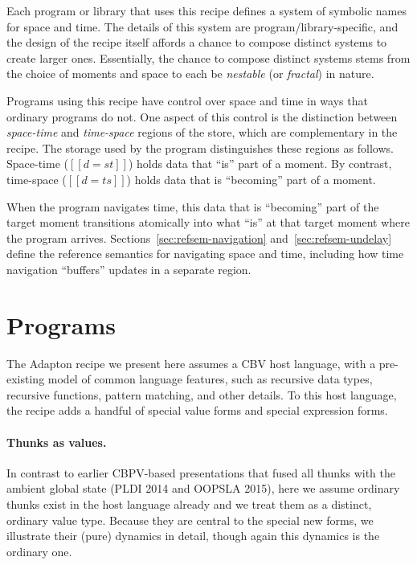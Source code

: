 \documentclass[11pt]{article}
\begin{document}
Each program or library that uses this recipe
defines a system of symbolic names for space and time.
The details of this system are program/library-specific, and the
design of the recipe itself affords a chance to compose distinct systems to
create larger ones.
Essentially, the chance to compose distinct systems stems from the choice of moments
and space to each be \emph{nestable} (or \emph{fractal}) in nature.

\nolinenumbers
\ottgrammartabular{
  {\makeLineNumber\stepLineNumber} \ottSpace
  \\
   {\makeLineNumber\stepLineNumber} \ottMoment
  \\
   {\makeLineNumber\stepLineNumber} \ottp
  \\
   {\makeLineNumber\stepLineNumber} \ottpp
  \\
  {\makeLineNumber\stepLineNumber} \ottd
}
\linenumbers

Programs using this recipe have control over space and time in ways
that ordinary programs do not.
%
One aspect of this control is the distinction between
\emph{space-time} and \emph{time-space} regions of the store, which are complementary in
the recipe.
%
The storage used by the program distinguishes these regions as follows.
%
Space-time ($[[d = st]]$) holds data that ``is'' part of a moment.
By contrast,
time-space ($[[d = ts]]$) holds data that is ``becoming'' part of a moment.

When the program navigates time, this data that is ``becoming'' part
of the target moment transitions atomically into what ``is'' at that
target moment where the program arrives.
%
Sections~\ref{sec:refsem-navigation} and~\ref{sec:refsem-undelay}
define the reference semantics for navigating space and time, including
how time navigation ``buffers'' updates in a separate region.


\section{Programs}
\label{sec:programs}

The Adapton recipe we present here assumes a CBV host language, with a
pre-existing model of common language features, such as recursive data
types, recursive functions, pattern matching, and other details.
%
To this host language, the recipe adds a handful of special value
forms and special expression forms.

\paragraph{Thunks as values.}
In contrast to earlier CBPV-based presentations that fused all thunks
with the ambient global state (PLDI 2014 and OOPSLA 2015), here we
assume ordinary thunks exist in the host language already and we treat
them as a distinct, ordinary value type.
%
Because they are central to the special new forms, we illustrate their
(pure) dynamics in detail, though again this dynamics is the ordinary one.
\end{document}

